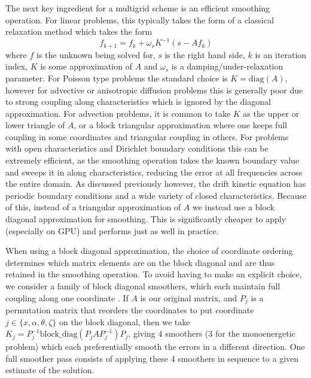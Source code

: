 \documentclass[11pt]{article}
\begin{document}
The next key ingredient for a multigrid scheme is an efficient smoothing
operation. For linear problems, this typically takes the form of a classical
relaxation method which takes the form
\begin{equation}
f_{k+1} = f_k + \omega_s K^{-1} (s - A f_k)
\end{equation}
where $f$ is the unknown being solved for, $s$ is the right hand side, $k$ is an
iteration index, $K$ is some approximation of $A$ and $\omega_s$ is a
damping/under-relaxation parameter. For Poisson type problems the standard
choice is $K = \mathrm{diag}(A)$, however for advective or anisotropic diffusion
problems this is generally poor due to strong coupling along characteristics
which is ignored by the diagonal approximation. For advection problems, it is
common to take $K$ as the upper or lower triangle of $A$, or a block triangular
approximation where one keeps full coupling in some coordinates and triangular
coupling in others. For problems with open characteristics and Dirichlet
boundary conditions this can be extremely efficient, as the smoothing operation
takes the known boundary value and sweeps it in along characteristics, reducing
the error at all frequencies across the entire domain. As discussed previously
however, the drift kinetic equation has periodic boundary conditions and a wide
variety of closed characteristics. Because of this, instead of a triangular
approximation of $A$ we instead use a block diagonal approximation for
smoothing. This is significantly cheaper to apply (especially on GPU) and
performs just as well in practice.

When using a block diagonal approximation, the choice of coordinate ordering
determines which matrix elements are on the block diagonal and are thus retained
in the smoothing operation. To avoid having to make an explicit choice, we
consider a family of block diagonal smoothers, which each maintain full coupling
along one coordinate \cite{oosterlee_multigrid_1998, elman_finite_2014}. If $A$
is our original matrix, and $P_j$ is a
permutation matrix that reorders the coordinates to put coordinate
$j \in \{x, \alpha, \theta, \zeta\}$ on the block diagonal, then we take
$K_j = P^{-1}_j \mathrm{block\_diag}(P_j A P_j^{-1}) P_j$, giving 4 smoothers (3
for the monoenergetic problem) which each preferentially smooth the errors in a
different direction. One full smoother pass consists of applying these 4
smoothers in sequence to a given estimate of the solution.
\end{document}
